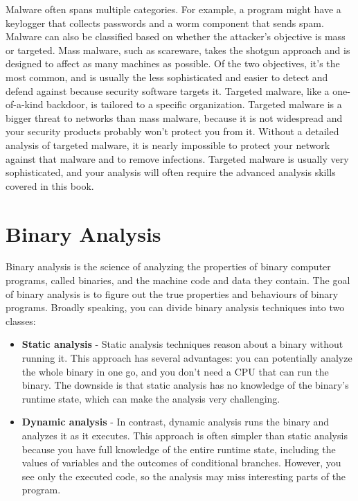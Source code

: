 \noindent Malware often spans multiple categories. For example, a program might have a keylogger that collects passwords and a worm component that sends spam. \\
Malware can also be classified based on whether the attacker’s objective is mass or targeted. Mass malware, such as scareware, takes the shotgun approach and is designed to affect as many machines as possible. Of the two objectives, it’s the most common, and is usually the less sophisticated and easier to detect and defend against because security software targets it. Targeted malware, like a one-of-a-kind backdoor, is tailored to a specific organization. Targeted malware is a bigger threat to networks than mass malware, because it is not widespread and your security products probably won’t protect you from it. Without a detailed analysis of targeted malware, it is nearly impossible to protect your network against that malware and to remove infections. Targeted malware is usually very sophisticated, and your analysis will often require the advanced analysis skills covered in this book.

\section{Binary Analysis}
Binary analysis is the science of analyzing the properties of binary computer programs, called binaries, and the machine code and data they contain. The goal of binary analysis is to figure out the true properties and behaviours of binary programs. Broadly speaking, you can divide binary analysis techniques into two classes:

\begin{itemize}
    \item \textbf{Static analysis} - Static analysis techniques reason about a binary without running it. This approach has several advantages: you can potentially analyze the whole binary in one go, and you don’t need a CPU that can run the binary. The downside is that static analysis has no knowledge of the binary’s runtime state, which can make the analysis very challenging.
    \item \textbf{Dynamic analysis} - In contrast, dynamic analysis runs the binary and analyzes it as it executes. This approach is often simpler than static analysis because you have full knowledge of the entire runtime state, including the values of variables and the outcomes of conditional branches. However, you see only the executed code, so the analysis may miss interesting parts of the program.
\end{itemize}


